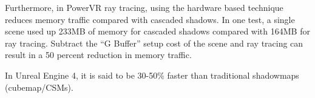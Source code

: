 Furthermore, in PowerVR ray tracing, using the hardware based technique reduces memory traffic compared with cascaded shadows. In one test, a single scene used up 233MB of memory for cascaded shadows compared with 164MB for ray tracing. Subtract the “G Buffer” setup cost of the scene and ray tracing can result in a 50 percent reduction in memory traffic. 

In Unreal Engine 4, it is said to be 30-50\% faster than traditional shadowmaps (cubemap/CSMs).











































